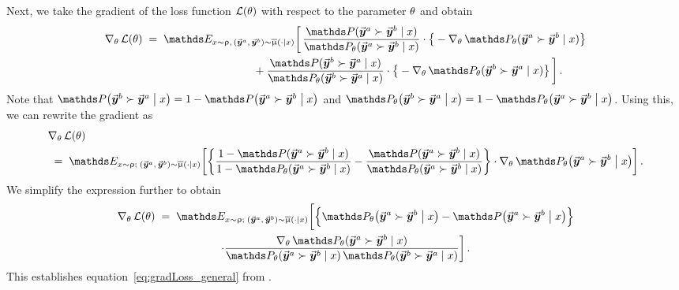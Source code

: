 	Next, we take the gradient of the loss function $\mathcal{L}(\theta)$ with respect to the parameter $\theta$ and obtain
	\begin{align*}
		\gradtheta \Loss(\paratheta)
		& \; = \; \Exp_{\prompt \sim \promptdistr, \, (\responseone, \, \responsetwo) \sim \responsedistravg(\cdot \mid \prompt)}
		\bigg[ \, \frac{\Prob( \responseone \succ \responsetwo \mid \prompt )}{\Probtheta ( \responseone \succ \responsetwo \mid \prompt )} \cdot \big\{ - \gradtheta \Probtheta( \responseone \succ \responsetwo \mid \prompt ) \big\}   \\
		& \qquad \qquad \qquad \qquad \qquad + \frac{\Prob( \responsetwo \succ \responseone \mid \prompt )}{\Probtheta( \responsetwo \succ \responseone \mid \prompt )} \cdot \big\{ - \gradtheta \Probtheta( \responsetwo \succ \responseone \mid \prompt ) \big\} \, \bigg] \, .
	\end{align*}
	Note that $\Prob\big( \responsetwo \succ \responseone \bigm| \prompt\big) = 1 - \Prob\big( \responseone \succ \responsetwo \bigm| \prompt\big)$ and $\Probtheta \big( \responsetwo \succ \responseone \bigm| \prompt\big) = 1 - \Probtheta \big( \responseone \succ \responsetwo \bigm| \prompt\big)$.
	Using this, we can rewrite the gradient as
	\begin{align*}
		& \gradtheta \Loss(\paratheta)  \\
		& \; = \;
		\Exp_{\prompt \sim \promptdistr; \; (\responseone, \, \responsetwo) \sim \responsedistravg(\cdot \mid \prompt)}
		\bigg[ \bigg\{ \frac{1 - \Prob( \responseone \succ \responsetwo \mid \prompt )}{1 - \Probtheta( \responseone \succ \responsetwo \mid \prompt )} - \frac{\Prob( \responseone \succ \responsetwo \mid \prompt )}{\Probtheta ( \responseone \succ \responsetwo \mid \prompt )} \bigg\} \cdot \gradtheta \Probtheta\big( \responseone \succ \responsetwo \bigm| \prompt \big) \bigg] \, .
	\end{align*}
	We simplify the expression further to obtain
	\begin{multline*}
		\gradtheta \Loss(\paratheta)
		\; = \;
		\Exp_{\prompt \sim \promptdistr; \; (\responseone, \, \responsetwo) \sim \responsedistravg(\cdot \mid \prompt)}
		\bigg[ \Big\{ \Probtheta \big( \responseone \succ \responsetwo \bigm| \prompt \big) - \Prob \big( \responseone \succ \responsetwo \bigm| \prompt \big) \Big\} \\ \cdot \frac{\gradtheta \Probtheta( \responseone \succ \responsetwo \mid \prompt )}{\Probtheta( \responseone \succ \responsetwo \mid \prompt ) \, \Probtheta( \responsetwo \succ \responseone \mid \prompt )} \bigg] \, .
	\end{multline*}
	This establishes equation~\eqref{eq:gradLoss_general} from . \\
	
